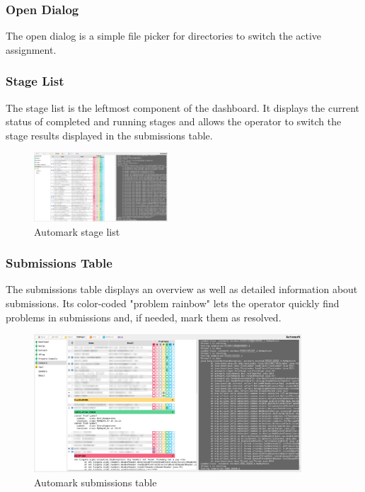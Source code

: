 \documentclass[12pt,a4paper,oneside]{report}
\begin{document}
	\subsubsection{Open Dialog}
	The open dialog is a simple file picker for directories to switch the active assignment.

	\pagebreak
	\subsubsection{Stage List}
	The stage list is the leftmost component of the dashboard. It displays the current status of completed and running stages and allows the operator to switch the stage results displayed in the submissions table.

	\begin{figure}[h]
		\centering
		\includegraphics[width=5cm,trim=0 30cm 78.9cm 1.5cm,clip]{automark_dashboard.png}
		\caption{Automark stage list}
	\end{figure}

	\subsubsection{Submissions Table}
	The submissions table displays an overview as well as detailed information about submissions. Its color-coded "problem rainbow" lets the operator quickly find problems in submissions and, if needed, mark them as resolved.

	\begin{figure}[h]
		\centering
		\includegraphics[width=10cm,trim=11.5cm 10cm 40cm 2cm,clip]{automark_dashboard_w_details_expanded.png}
		\caption{Automark submissions table}
	\end{figure}
\end{document}
